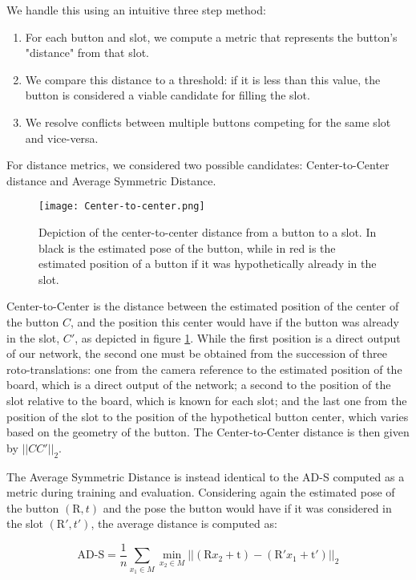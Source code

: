 We handle this using an intuitive three step method:
\begin{enumerate}
    \item For each button and slot, we compute a metric that represents the button's "distance" from that slot.
    \item We compare this distance to a threshold: if it is less than this value, the button is considered a viable candidate for filling the slot.
    \item We resolve conflicts between multiple buttons competing for the same slot and vice-versa.
\end{enumerate}

For distance metrics, we considered two possible candidates: Center-to-Center distance and Average Symmetric Distance.

\begin{figure}[ht]
    \texttt{[image: Center-to-center.png]}
    \caption{Depiction of the center-to-center distance from a button to a slot. In black is the estimated pose of the button, while in red is the estimated position of a button if it was hypothetically already in the slot.}
    \label{fig:center2center}
\end{figure}

Center-to-Center is the distance between the estimated position of the center of the button $C$, and the position this center would have if the button was already in the slot, $C'$, as depicted in figure \ref{fig:center2center}. While the first position is a direct output of our network, the second one must be obtained from the succession of three roto-translations: one from the camera reference to the estimated position of the board, which is a direct output of the network; a second to the position of the slot relative to the board, which is known for each slot; and the last one from the position of the slot to the position of the hypothetical button center, which varies based on the geometry of the button. The Center-to-Center distance is then given by $||CC'||_2$.

The Average Symmetric Distance is instead identical to the AD-S computed as a metric during training and evaluation. Considering again the estimated pose of the button $(\text{R}, t)$ and the pose the button would have if it was considered in the slot $(\text{R}', t')$, the average distance is computed as:

\begin{equation*}
    \text{AD-S} = \frac{1}{n} \sum_{x_1 \in M} \min_{x_2 \in M} ||(\text{R}x_2 + \text{t}) - 
    (\text{R}'x_1 + \text{t}')||_2
\end{equation*}

